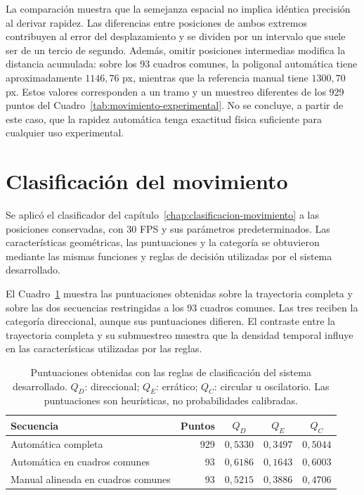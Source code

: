 La comparación muestra que la semejanza espacial no implica idéntica precisión al derivar rapidez. Las diferencias entre posiciones de ambos extremos contribuyen al error del desplazamiento y se dividen por un intervalo que suele ser de un tercio de segundo. Además, omitir posiciones intermedias modifica la distancia acumulada: sobre los 93 cuadros comunes, la poligonal automática tiene aproximadamente $1146{,}76$ px, mientras que la referencia manual tiene $1300{,}70$ px. Estos valores corresponden a un tramo y un muestreo diferentes de los 929 puntos del Cuadro~\ref{tab:movimiento-experimental}. No se concluye, a partir de este caso, que la rapidez automática tenga exactitud física suficiente para cualquier uso experimental.

\section{Clasificación del movimiento}

Se aplicó el clasificador del capítulo~\ref{chap:clasificacion-movimiento} a las posiciones conservadas, con 30 FPS y sus parámetros predeterminados. Las características geométricas, las puntuaciones y la categoría se obtuvieron mediante las mismas funciones y reglas de decisión utilizadas por el sistema desarrollado.

El Cuadro~\ref{tab:clasificacion-experimental} muestra las puntuaciones obtenidas sobre la trayectoria completa y sobre las dos secuencias restringidas a los 93 cuadros comunes. Las tres reciben la categoría direccional, aunque sus puntuaciones difieren. El contraste entre la trayectoria completa y su submuestreo muestra que la densidad temporal influye en las características utilizadas por las reglas.

\begin{table}[htbp]
 \centering
 \caption{Puntuaciones obtenidas con las reglas de clasificación del sistema desarrollado. $Q_D$: direccional; $Q_E$: errático; $Q_C$: circular u oscilatorio. Las puntuaciones son heurísticas, no probabilidades calibradas.}
 \label{tab:clasificacion-experimental}
 \small
 \begin{tabularx}{\textwidth}{@{}Xrccc@{}}
  \toprule
  Secuencia & Puntos & $Q_D$ & $Q_E$ & $Q_C$ \\
  \midrule
  Automática completa & 929 & $0{,}5330$ & $0{,}3497$ & $0{,}5044$ \\
  Automática en cuadros comunes & 93 & $0{,}6186$ & $0{,}1643$ & $0{,}6003$ \\
  Manual alineada en cuadros comunes & 93 & $0{,}5215$ & $0{,}3886$ & $0{,}4706$ \\
  \bottomrule
 \end{tabularx}
\end{table}


